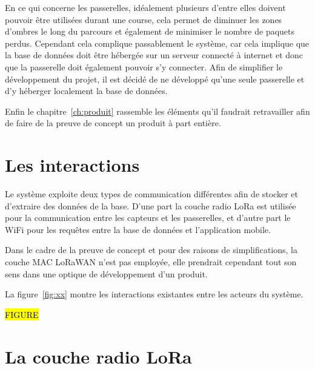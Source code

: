 En ce qui concerne les passerelles, idéalement plusieurs d'entre elles doivent pouvoir être utilisées durant une course, cela permet de diminuer les zones d'ombres le long du parcours et également de minimiser le nombre de paquets perdus. Cependant cela complique passablement le système, car cela implique que la base de données doit être hébergée sur un serveur connecté à internet et donc que la passerelle doit également pouvoir s'y connecter. Afin de simplifier le développement du projet, il est décidé de ne développé qu'une seule passerelle et d'y héberger localement la base de données.

Enfin le chapitre~\ref{ch:produit} rassemble les éléments qu'il faudrait retravailler afin de faire de la preuve de concept un produit à part entière.

\section{Les interactions}

Le système exploite deux types de communication différentes afin de stocker et d'extraire des données de la base. D'une part la couche radio LoRa est utilisée pour la communication entre les capteurs et les passerelles, et d'autre part le WiFi pour les requêtes entre la base de données et l'application mobile. 

Dans le cadre de la preuve de concept et pour des raisons de simplifications, la couche MAC LoRaWAN n'est pas employée, elle prendrait cependant tout son sens dans une optique de développement d'un produit.

La figure~\ref{fig:xx} montre les interactions existantes entre les acteurs du système.

{\LARGE \hl{FIGURE}}

\section{La couche radio LoRa}




